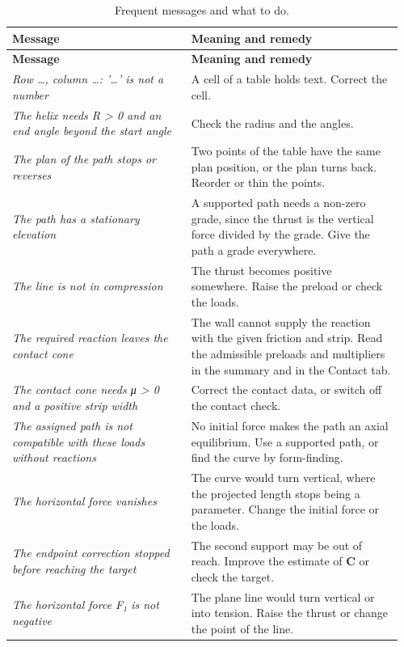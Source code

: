 \documentclass[fontsize=10.5pt,paper=a4,parskip=half,headings=normal,numbers=noenddot,
  open=any,bibliography=totoc,captions=tableheading]{scrreprt}
\numberwithin{figure}{chapter}
\numberwithin{table}{chapter}
\newcommand{\C}{\mathbf C}
\newcommand{\ui}[1]{{\sffamily\color{ink}#1}}
\begin{document}
{\small
\begin{longtable}{@{}>{\raggedright\arraybackslash}p{0.44\linewidth}>{\raggedright\arraybackslash}p{0.52\linewidth}@{}}
\caption{Frequent messages and what to do.}\label{tab:messages}\\
\toprule
\bfseries Message & \bfseries Meaning and remedy\\ \midrule
\endfirsthead
\toprule
\bfseries Message & \bfseries Meaning and remedy\\ \midrule
\endhead
\bottomrule
\endfoot
\emph{Row …, column …: '…' is not a number} & A cell of a table holds text. Correct the cell.\\
\emph{The helix needs R > 0 and an end angle beyond the start angle} & Check the radius and the
angles.\\
\emph{The plan of the path stops or reverses} & Two points of the table have the same plan position, or
the plan turns back. Reorder or thin the points.\\
\emph{The path has a stationary elevation} & A supported path needs a non-zero grade, since the thrust
is the vertical force divided by the grade. Give the path a grade everywhere.\\
\emph{The line is not in compression} & The thrust becomes positive somewhere. Raise the preload or
check the loads.\\
\emph{The required reaction leaves the contact cone} & The wall cannot supply the reaction with the
given friction and strip. Read the admissible preloads and multipliers in the summary and in the
\ui{Contact} tab.\\
\emph{The contact cone needs μ > 0 and a positive strip width} & Correct the contact data, or switch
off the contact check.\\
\emph{The assigned path is not compatible with these loads without reactions} & No initial force makes
the path an axial equilibrium. Use a supported path, or find the curve by form-finding.\\
\emph{The horizontal force vanishes} & The curve would turn vertical, where the projected length
stops being a parameter. Change the initial force or the loads.\\
\emph{The endpoint correction stopped before reaching the target} & The second support may be out of
reach. Improve the estimate of $\C$ or check the target.\\
\emph{The horizontal force F₁ is not negative} & The plane line would turn vertical or into tension.
Raise the thrust or change the point of the line.\\

\end{longtable}}
\end{document}

